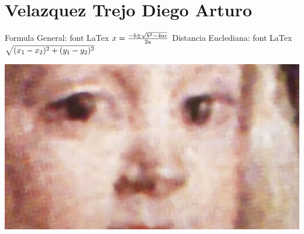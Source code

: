 \chapter{Velazquez Trejo Diego Arturo}

Formula General: {\fontsize{80}{0}\select font LaTex}
$ \\ x = \frac{-b\pm\sqrt{b^{2}-4ac}}{2a} \\$
Distancia Euclediana: {\fontsize{80}{0}\select font LaTex}
$ \\ \sqrt{(x_1 - x_2)^2 + (y_1 - y_2)^2} \\$

\includegraphics{./317227257/velaske.jpg}

